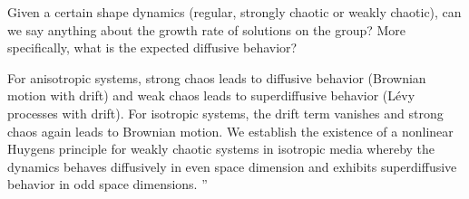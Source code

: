 \documentclass[letter,10pt,openany]{article}
\begin{document}
\begin{description}
{Given a certain shape dynamics
(regular, strongly chaotic or weakly chaotic), can we say anything
about the growth rate of solutions on the group? More specifically,
what is the expected diffusive behavior?

For anisotropic systems, strong chaos leads to diffusive behavior
(Brownian motion with drift) and weak chaos leads to superdiffusive
behavior (Lévy processes with drift). For isotropic systems, the drift
term vanishes and strong chaos again leads to Brownian motion. We
establish the existence of a nonlinear Huygens principle for weakly
chaotic systems in isotropic media whereby the dynamics behaves
diffusively in even space dimension and exhibits superdiffusive behavior
in odd space dimensions.
''
    }

\end{description}











  \renewcommand{\ssp}{a}            %
  \renewcommand\xInit{{a_0}}        %
  \renewcommand{\deltaX}{{\delta a}}    %
  \renewcommand\velField[1]{{F(#1)}}    %
  \renewcommand\velField[1]{{u(#1)}}    %
\end{document}
